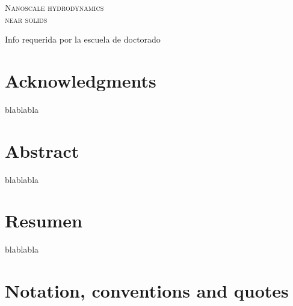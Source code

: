 \documentclass[b5paper,openright,11pt]{book}
\begin{document}
\begin{titlepage}
\begin{center}
\begin{Huge}
\textsc{Nanoscale hydrodynamics \\ near solids}
\end{Huge}
\end{center}
\end{titlepage}


\newpage
\pagestyle{noHeader}
Info requerida por la escuela de doctorado
\thispagestyle{empty} %

\newpage
{} %

\tableofcontents %

\chapter*{Acknowledgments} %
blablabla

\chapter*{Abstract} %
blablabla

\chapter*{Resumen} %
blablabla

\chapter*{Notation, conventions and quotes}
\end{document}
